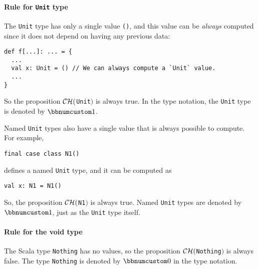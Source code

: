 \paragraph{Rule for \lstinline!Unit!
type}

The \lstinline!Unit! type
has only a single value \lstinline!()!,
and this value can be \emph{always} computed since it does not depend
on having any previous data:
\begin{lstlisting}
def f[...]: ... = {
  ...
  val x: Unit = () // We can always compute a `Unit` value.
  ...
}
\end{lstlisting}
So the proposition ${\cal CH}($\lstinline!Unit!$)$
is always true. In the type notation, the \lstinline!Unit!
type is denoted by $\bbnum 1$.

Named \lstinline!Unit!
types also have a single value that is always
possible to compute. For example,
\begin{lstlisting}
final case class N1()
\end{lstlisting}
defines a named \lstinline!Unit!
type, and it can be computed as
\begin{lstlisting}
val x: N1 = N1()
\end{lstlisting}
So, the proposition ${\cal CH}($\lstinline!N1!$)$
is always true. Named \lstinline!Unit!
types are denoted by $\bbnum 1$, just as the \lstinline!Unit!
type itself.

\paragraph{Rule for the void type}

The Scala type \lstinline!Nothing!
has no values, so the proposition ${\cal CH}($\lstinline!Nothing!$)$
is always false. The type \lstinline!Nothing!
is denoted by $\bbnum 0$ in the type notation.

